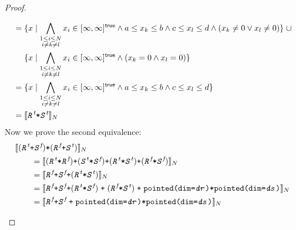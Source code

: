 \documentclass{article}
\theoremstyle{definition}
\theoremstyle{plain}
\newcommand{\interp}[1]{\llbracket {#1} \rrbracket}
\newcommand{\interv}[3]{\textnormal{$\lbrack#1,#2\rbrack^{#3}$}}
\newcommand{\textcap}[1]{\texttt{\textit{#1}}}
\begin{document}
\begin{proof}
\begin{description}
\begin{align*}
        & = \{ x \mid
            \bigwedge_{\substack{1 \leq i \leq N \\ i \neq k \neq l}} x_i \in
              \interv{\infty}{\infty}{\textsf{true}}
            \wedge a \leq x_k \leq b
          \wedge c \leq x_l \leq d \wedge {(x_k \neq 0 \vee x_l \neq 0)} \}
          \;\cup \\
        & \quad\,\, \{ x \mid
            \bigwedge_{\substack{1 \leq i \leq N \\ i \neq k \neq l}} x_i \in
              \interv{\infty}{\infty}{\textsf{true}}
            \wedge (x_k = 0 \wedge x_l = 0) \} \\
        & = \{ x \mid
            \bigwedge_{\substack{1 \leq i \leq N \\ i \neq k \neq l}} x_i \in
              \interv{\infty}{\infty}{\textsf{true}}
            \wedge a \leq x_k \leq b
            \wedge c \leq x_l \leq d \} \\
        & = \interp{\textcap{R}^{\textit{t}} \texttt{*} \textcap{S}^{\textit{t}}}_N
      \end{align*}
%
      Now we prove the second equivalence:
      \begin{align*}
        \hspace{2em}&\hspace{-2em} \interp{
            (\textcap{R}^{\textit{t}} \texttt{+} \textcap{S}^{\textit{f}})
            \texttt{*}
            (\textcap{R}^{\textit{f}} \texttt{+} \textcap{S}^{\textit{t}})
          }_N \\
        &= \interp{
             (\textcap{R}^{\textit{t}} \texttt{*} \textcap{R}^{\textit{f}})
             \texttt{+}
             (\textcap{S}^{\textit{t}} \texttt{*} \textcap{S}^{\textit{f}})
             \texttt{+}
             (\textcap{R}^{\textit{t}} \texttt{*} \textcap{S}^{\textit{t}})
             \texttt{+}
             (\textcap{R}^{\textit{f}} \texttt{*} \textcap{S}^{\textit{f}})
           }_N \\
        &= \interp{
             \textcap{R}^{\textit{f}}
             \texttt{+}
             \textcap{S}^{\textit{f}}
             \texttt{+}
             (\textcap{R}^{\textit{t}} \texttt{*} \textcap{S}^{\textit{t}})
           }_N \\
        &= \interp
             {\textcap{R}^{\textit{f}}
              \texttt{+}
              \textcap{S}^{\textit{f}}
              \texttt{+}
              {(\textcap{R}^{\textit{t}} \texttt{*} \textcap{S}^{\textit{f}})}
               \;\texttt{+}\;
               {(\textcap{R}^{\textit{f}} \texttt{*} \textcap{S}^{\textit{t}})}
               \;\texttt{+}\;
               \texttt{pointed(dim=\textcap{dr})*pointed(dim=\textcap{ds})}}_N \\
        &= \interp{\textcap{R}^{\textit{f}} \texttt{+} \textcap{S}^{\textit{f}}
                   \;\texttt{+}\;
                   \texttt{pointed(dim=\textcap{dr})*pointed(dim=\textcap{ds})}}_N
      \end{align*}
  \end{description}
\end{proof}
\end{document}
